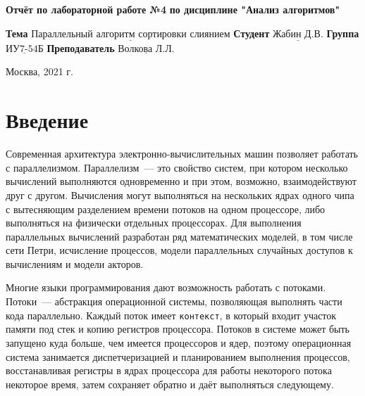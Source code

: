 \documentclass[12pt, a4paper]{report}
\begin{document}
\begin{titlepage}
	
	\begin{center}
		\noindent
			\LARGE\textbf{Отчёт по лабораторной работе №4}\newline
			\textbf{по дисциплине "Анализ алгоритмов"}\newline\newline
	\end{center}
	
	\large\noindent\textbf{Тема} $\underline{\text{Параллельный алгоритм сортировки слиянием}}$\newline\newline
	\noindent\textbf{Студент} $\underline{\text{Жабин Д.В.}}$\newline\newline
	\noindent\textbf{Группа} $\underline{\text{ИУ7-54Б}}$\newline\newline
	\noindent\textbf{Преподаватель} $\underline{\text{Волкова Л.Л.}}$\newline\newline\newline
	
	\begin{center}
		\large\vfill
		Москва, 2021 г.
	\end{center}
\end{titlepage}

\setlength{\parindent}{1.25cm}

\setcounter{page}{2}\large\linespread{1.3}\tableofcontents

\newpage
\chapter*{Введение}

Современная архитектура электронно-вычислительных машин позволяет работать с параллелизмом. Параллелизм~--- это свойство систем, при котором несколько вычислений выполняются одновременно и при этом, возможно, взаимодействуют друг с другом. Вычисления могут выполняться на нескольких ядрах одного чипа с вытесняющим разделением времени потоков на одном процессоре, либо выполняться на физически отдельных процессорах. Для выполнения параллельных вычислений разработан ряд математических моделей, в том числе сети Петри, исчисление процессов, модели параллельных случайных доступов к вычислениям и модели акторов.

Многие языки программирования дают возможность работать с потоками. Потоки~--- абстракция операционной системы, позволяющая выполнять части кода параллельно. Каждый поток имеет \verb|контекст|, в который входит участок памяти под стек и копию регистров процессора. Потоков в системе может быть запущено куда больше, чем имеется процессоров и ядер, поэтому операционная система занимается диспетчеризацией и планированием выполнения процессов, восстанавливая регистры в ядрах процессора для работы некоторого потока некоторое время, затем сохраняет обратно и даёт выполняться следующему. 
\end{document}
